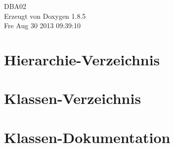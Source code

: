 \documentclass[twoside]{book}
\newcommand{\clearemptydoublepage}{%
  \newpage{\pagestyle{empty}\cleardoublepage}%
}
\begin{document}
\hypersetup{pageanchor=false}
\begin{titlepage}
\vspace*{7cm}
\begin{center}%
{\Large D\-B\-A02 }\\
\vspace*{1cm}
{\large Erzeugt von Doxygen 1.8.5}\\
\vspace*{0.5cm}
{\small Fre Aug 30 2013 09:39:10}\\
\end{center}
\end{titlepage}
\clearemptydoublepage
\tableofcontents
\clearemptydoublepage
{}
\hypersetup{pageanchor=true}

\chapter{Hierarchie-\/\-Verzeichnis}

\chapter{Klassen-\/\-Verzeichnis}

\chapter{Klassen-\/\-Dokumentation}




















\newpage
{}
{}
\printindex
\end{document}
